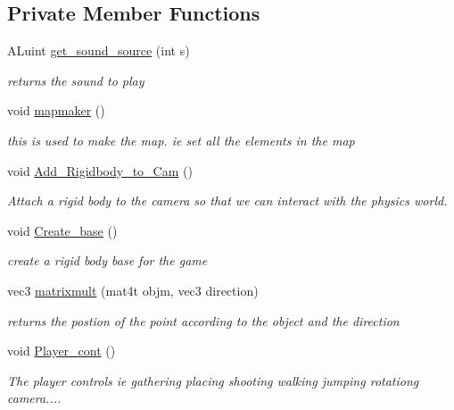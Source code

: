 \subsection*{Private Member Functions}
\begin{DoxyCompactItemize}
\item 
A\+Luint \hyperlink{classoctet_1_1minecraft__wars_ae988d46dbc1d01cd23bc6537f1ee0a48}{get\+\_\+sound\+\_\+source} (int s)
\begin{DoxyCompactList}\small\item\em returns the sound to play \end{DoxyCompactList}\item 
void \hyperlink{classoctet_1_1minecraft__wars_a73ae144486185995823024e3e5cd492e}{mapmaker} ()
\begin{DoxyCompactList}\small\item\em this is used to make the map. ie set all the elements in the map \end{DoxyCompactList}\item 
void \hyperlink{classoctet_1_1minecraft__wars_a8ede0f5f9aeab879cdf150c43ea67eff}{Add\+\_\+\+Rigidbody\+\_\+to\+\_\+\+Cam} ()
\begin{DoxyCompactList}\small\item\em Attach a rigid body to the camera so that we can interact with the physics world. \end{DoxyCompactList}\item 
void \hyperlink{classoctet_1_1minecraft__wars_a995d28ddd52f75acd16d8abe8f2f2f20}{Create\+\_\+base} ()
\begin{DoxyCompactList}\small\item\em create a rigid body base for the game \end{DoxyCompactList}\item 
vec3 \hyperlink{classoctet_1_1minecraft__wars_a3b33cb6cef05571ad2072adcecafd47c}{matrixmult} (mat4t objm, vec3 direction)
\begin{DoxyCompactList}\small\item\em returns the postion of the point according to the object and the direction \end{DoxyCompactList}\item 
void \hyperlink{classoctet_1_1minecraft__wars_a95f7058870a6892289fc8bac7c60f714}{Player\+\_\+cont} ()
\begin{DoxyCompactList}\small\item\em The player controls ie gathering placing shooting walking jumping rotationg camera.... \end{DoxyCompactList}\item 

\end{DoxyCompactItemize}
